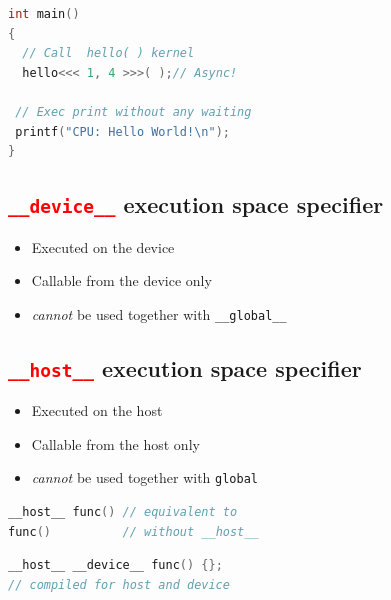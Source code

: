 \begin{minipage}{0.5\linewidth}
\begin{lstlisting}[language=C++,xleftmargin=1pt]
int main()
{
  // Call  hello( ) kernel
  hello<<< 1, 4 >>>( );// Async!

 // Exec print without any waiting
 printf("CPU: Hello World!\n");
}
\end{lstlisting}
\end{minipage}
\begin{minipage}{0.5\linewidth}
  \subsection*{\textcolor{Red}{\texttt{\_\_device\_\_}} execution space specifier}
  \flushleft
  \begin{itemize}
  \item Executed on the device
  \item Callable from the device only
  \item \emph{cannot} be used together with \texttt{\_\_global\_\_}
  \end{itemize}
\end{minipage}
\begin{minipage}{0.5\linewidth}
  \subsection*{\textcolor{Red}{\texttt{\_\_host\_\_}} execution space specifier}
  \flushleft
  \begin{itemize}
  \item Executed on the host
  \item Callable from the host only
  \item \emph{cannot} be used together with \texttt{global}
  \end{itemize}
\end{minipage}
\begin{minipage}{0.5\linewidth}
\begin{lstlisting}[language=C++,xleftmargin=1pt,xrightmargin=2pt]
__host__ func() // equivalent to
func()          // without __host__
\end{lstlisting}
\end{minipage}
\begin{minipage}{0.5\linewidth}
\begin{lstlisting}[language=C++,xleftmargin=2pt]
__host__ __device__ func() {};
// compiled for host and device
\end{lstlisting}
\end{minipage}
